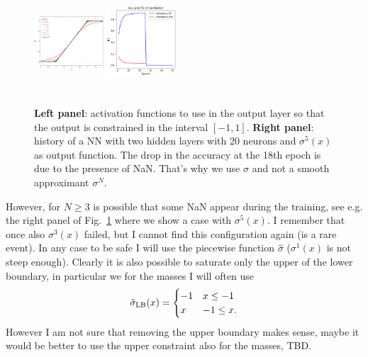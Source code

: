 \documentclass[prd,aps,twocolumn,a4paper,showkeys,nofootinbib]{revtex4-1}
\begin{document}
\begin{figure}[t]
  \center
  \includegraphics[width=0.23\textwidth,height=3.7cm]{./Figs/out_activation_function.png}
  \includegraphics[width=0.23\textwidth,height=3.9cm]{./Figs/history_sigma5_layers20+20.png}
  \caption{\label{fig:out_act_f} \textbf{Left panel}: activation functions to use in the 
  output layer so that the output is constrained in the interval $[-1,1]$.
  \textbf{Right panel}: history of a NN with two hidden layers with 20 neurons 
  and $\sigma^5(x)$ as output function.
  The drop in the accuracy at the 18th epoch is due to the presence of NaN.
  That's why we use $\hat{\sigma}$ and not a smooth approximant $\sigma^N$.}
\end{figure}
%
However, for $N\geq 3$ is possible that some NaN appear during the training, see e.g. the right
panel of Fig.~\ref{fig:out_act_f} where we show a case with $\sigma^5(x)$. 
I remember that once also $\sigma^3(x)$ failed, but I 
cannot find this configuration again (is a rare event). 
In any case to be safe I will use the piecewise function $\hat{\sigma}$ ($\sigma^1(x)$ is 
not steep enough).
Clearly it is also possible to saturate only the upper of the lower boundary, in particular we 
for the masses I will often use
\begin{equation}
\hat{\sigma}_{\rm LB}(x) = \begin{cases} 
      -1 & x\leq -1 \\
      x & -1\leq x.
\end{cases}
\end{equation}
However I am not sure that removing the upper boundary makes sense, maybe it would 
be better to use the upper constraint also for the masses, TBD.
%
\end{document}
